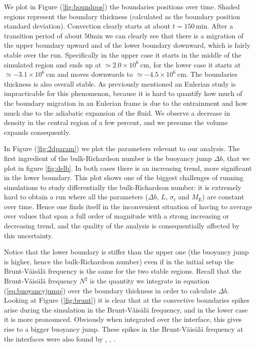 We plot in Figure (\ref{fig:boundpos}) the boundaries positions over time. Shaded regions represent the boundary thickness (calculated as the boundary position standard deviation). Convection clearly starts at about $t=150 \, \mathrm{min}$. After a transition period of about $50 \mathrm{min}$ we can clearly see that there is a migration of the upper boundary upward and of the lower boundary downward, which is fairly stable over the run. Specifically in the upper case it starts in the middle of the simulated region and ends up at $\simeq 2.0 \times 10^{6} \ \mathrm{cm}$, for the lower case it starts at $\simeq - 3.1 \times 10^{6} \ \mathrm{cm}$ and moves downwards to $\simeq - 4.5 \times 10^{6} \ \mathrm{cm}$. The boundaries thickness is also overall stable. As previously mentioned an Eulerian study is impracticable for this phenomenon, because it is hard to quantify how much of the boundary migration in an Eulerian frame is due to the entrainment and how much due to the adiabatic expansion of the fluid. We observe a decrease in density in the central region of a few percent, and we presume the volume expands consequently. 

In Figure (\ref{fig:2dparam}) we plot the parameters relevant to our analysis. 
The first ingredient of the bulk-Richardson number is the buoyancy jump $\Delta b$, that we plot in figure \ref{fig:delb}. In both cases there is an increasing trend, more significant in the lower boundary. This plot shows one of the biggest challenges of running simulations to study differentially the bulk-Richardson number: it is extremely hard to obtain a run where all the parameters ($\Delta b$, $L$, $\sigma_t$ and $M_{\mathrm{E}}$) are constant over time. Hence one finds itself in the inconvenient situation of having to average over values that span a full order of magnitude with a strong increasing or decreasing trend, and the quality of the analysis is consequentially affected by this uncertainty. 

Notice that the lower boundary is stiffer than the upper one (the buoyancy jump is higher, hence the bulk-Richardson number) even if in the initial setup the Brunt-Väisälä frequency is the same for the two stable regions. Recall that the Brunt-Väisälä frequency $N^2$ is the quantity we integrate in equation (\ref{eq:buoyancyjump}) over the boundary thickness in order to calculate $\Delta b$. Looking at Figure (\ref{fig:brunt}) it is clear that at the convective boundaries spikes arise during the simulation in the Brunt-Väisälä frequency, and in the lower case it is more pronounced. Obviously when integrated over the interface, this gives rise to a bigger buoyancy jump. These spikes in the Brunt-Väisälä frequency at the interfaces were also found by \citet{viallet2013}, \citet{arnett2015}, \citet{cristini}.

